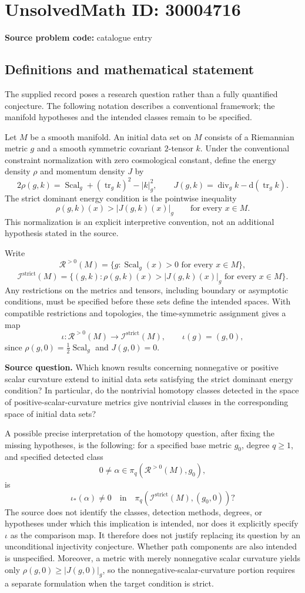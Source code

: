 \documentclass[11pt]{article}
\begin{document}
\section*{UnsolvedMath ID: 30004716}
\textbf{Source problem code:} catalogue entry
\subsection{Definitions and mathematical statement}
The supplied record poses a research question rather than a fully quantified conjecture. The following notation describes a conventional framework; the manifold hypotheses and the intended classes remain to be specified.

Let \(M\) be a smooth manifold. An initial data set on \(M\) consists of a Riemannian metric \(g\) and a smooth symmetric covariant \(2\)-tensor \(k\). Under the conventional constraint normalization with zero cosmological constant, define the energy density \(\rho\) and momentum density \(J\) by
\[
2\rho(g,k)=\operatorname{Scal}_g+(\operatorname{tr}_g k)^2-|k|_g^2,
\qquad
J(g,k)=\operatorname{div}_g k-\mathrm d(\operatorname{tr}_g k).
\]
The strict dominant energy condition is the pointwise inequality
\[
\rho(g,k)(x)>|J(g,k)(x)|_g\qquad\text{for every }x\in M.
\]
This normalization is an explicit interpretive convention, not an additional hypothesis stated in the source.

Write
\[
\mathcal R^{>0}(M)=\{g:\operatorname{Scal}_g(x)>0\text{ for every }x\in M\},
\]
\[
\mathcal I^{\mathrm{strict}}(M)
=\{(g,k):\rho(g,k)(x)>|J(g,k)(x)|_g\text{ for every }x\in M\}.
\]
Any restrictions on the metrics and tensors, including boundary or asymptotic conditions, must be specified before these sets define the intended spaces. With compatible restrictions and topologies, the time-symmetric assignment gives a map
\[
\iota:\mathcal R^{>0}(M)\longrightarrow\mathcal I^{\mathrm{strict}}(M),
\qquad \iota(g)=(g,0),
\]
since \(\rho(g,0)=\tfrac12\operatorname{Scal}_g\) and \(J(g,0)=0\).

\textbf{Source question.} Which known results concerning nonnegative or positive scalar curvature extend to initial data sets satisfying the strict dominant energy condition? In particular, do the nontrivial homotopy classes detected in the space of positive-scalar-curvature metrics give nontrivial classes in the corresponding space of initial data sets?

A possible precise interpretation of the homotopy question, after fixing the missing hypotheses, is the following: for a specified base metric \(g_0\), degree \(q\geq1\), and specified detected class
\[
0\ne\alpha\in\pi_q(\mathcal R^{>0}(M),g_0),
\]
is
\[
\iota_*(\alpha)\ne0
\quad\text{in}\quad
\pi_q(\mathcal I^{\mathrm{strict}}(M),(g_0,0))?
\]
The source does not identify the classes, detection methods, degrees, or hypotheses under which this implication is intended, nor does it explicitly specify \(\iota\) as the comparison map. It therefore does not justify replacing its question by an unconditional injectivity conjecture. Whether path components are also intended is unspecified. Moreover, a metric with merely nonnegative scalar curvature yields only \(\rho(g,0)\geq|J(g,0)|_g\), so the nonnegative-scalar-curvature portion requires a separate formulation when the target condition is strict.
\end{document}
